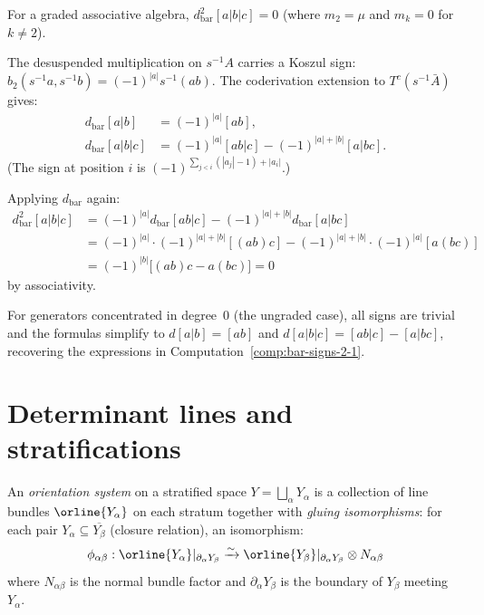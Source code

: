 \begin{computation}[\texorpdfstring{$d^2 = 0$}{d\textasciicircum 2 = 0} in degree 3]
\label{ver:d2-degree3}
For a graded associative algebra, $d_{\mathrm{bar}}^2[a|b|c] = 0$
(where $m_2 = \mu$ and $m_k = 0$ for $k \neq 2$).

The desuspended multiplication on $s^{-1}A$ carries a Koszul sign:
$b_2(s^{-1}a, s^{-1}b) = (-1)^{|a|} s^{-1}(ab)$. The coderivation extension
to $T^c(s^{-1}\bar{A})$ gives:
\begin{align*}
d_{\mathrm{bar}}[a|b] &= (-1)^{|a|}[ab], \\
d_{\mathrm{bar}}[a|b|c] &= (-1)^{|a|}[ab|c] - (-1)^{|a|+|b|}[a|bc].
\end{align*}
(The sign at position $i$ is $(-1)^{\sum_{j<i}(|a_j|-1) + |a_i|}$.)

Applying $d_{\mathrm{bar}}$ again:
\begin{align*}
d_{\mathrm{bar}}^2[a|b|c] &= (-1)^{|a|} d_{\mathrm{bar}}[ab|c]
 - (-1)^{|a|+|b|} d_{\mathrm{bar}}[a|bc] \\
&= (-1)^{|a|} \cdot (-1)^{|a|+|b|} [(ab)c]
 - (-1)^{|a|+|b|} \cdot (-1)^{|a|} [a(bc)] \\
&= (-1)^{|b|}\bigl[(ab)c - a(bc)\bigr] = 0
\end{align*}
by associativity.

\begin{remark}
For generators concentrated in degree~0 (the ungraded case), all signs are
trivial and the formulas simplify to $d[a|b] = [ab]$ and
$d[a|b|c] = [ab|c] - [a|bc]$, recovering the expressions in
Computation~\ref{comp:bar-signs-2-1}.
\end{remark}
\end{computation}


\section{Determinant lines and stratifications}
\label{sec:det-strat}

\begin{definition}
\label{def:orientation-system}
An \emph{orientation system} on a stratified space $Y = \bigsqcup_\alpha Y_\alpha$
is a collection of line bundles $\orline{Y_\alpha}$ on each stratum together with
\emph{gluing isomorphisms}: for each pair $Y_\alpha \subseteq \overline{Y_\beta}$
(closure relation), an isomorphism:
\[
\phi_{\alpha\beta}: \orline{Y_\alpha}|_{\partial_\alpha Y_\beta} \xrightarrow{\sim}
\orline{Y_\beta}|_{\partial_\alpha Y_\beta} \otimes N_{\alpha\beta}
\]
where $N_{\alpha\beta}$ is the normal bundle factor and $\partial_\alpha Y_\beta$
is the boundary of $Y_\beta$ meeting $Y_\alpha$.
\end{definition}


